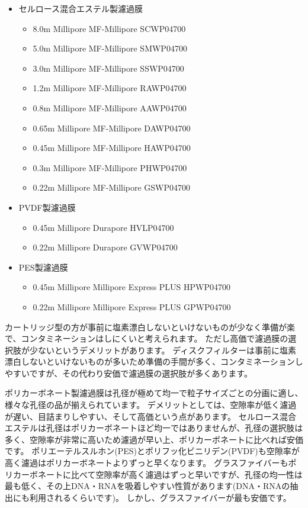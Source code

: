 \documentclass[titlepage,10pt,a4paper]{jsbook}
\begin{document}
\begin{itemize}
\begin{itemize}
\begin{itemize}
\item 0.4{\textmu}m Millipore Isopore HTTP04700
\item 0.22{\textmu}m Millipore Isopore GTTP04700
\end{itemize}
\item セルロース混合エステル製濾過膜
\begin{itemize}
\item 8.0{\textmu}m Millipore MF-Millipore SCWP04700
\item 5.0{\textmu}m Millipore MF-Millipore SMWP04700
\item 3.0{\textmu}m Millipore MF-Millipore SSWP04700
\item 1.2{\textmu}m Millipore MF-Millipore RAWP04700
\item 0.8{\textmu}m Millipore MF-Millipore AAWP04700
\item 0.65{\textmu}m Millipore MF-Millipore DAWP04700
\item 0.45{\textmu}m Millipore MF-Millipore HAWP04700
\item 0.3{\textmu}m Millipore MF-Millipore PHWP04700
\item 0.22{\textmu}m Millipore MF-Millipore GSWP04700
\end{itemize}
\item PVDF製濾過膜
\begin{itemize}
\item 0.45{\textmu}m Millipore Durapore HVLP04700
\item 0.22{\textmu}m Millipore Durapore GVWP04700
\end{itemize}
\item PES製濾過膜
\begin{itemize}
\item 0.45{\textmu}m Millipore Millipore Express PLUS HPWP04700
\item 0.22{\textmu}m Millipore Millipore Express PLUS GPWP04700
\end{itemize}
\end{itemize}
\end{itemize}

カートリッジ型の方が事前に塩素漂白しないといけないものが少なく準備が楽で、コンタミネーションはしにくいと考えられます。
ただし高価で濾過膜の選択肢が少ないというデメリットがあります。
ディスクフィルターは事前に塩素漂白しないといけないものが多いため準備の手間が多く、コンタミネーションしやすいですが、その代わり安価で濾過膜の選択肢が多くあります。

ポリカーボネート製濾過膜は孔径が極めて均一で粒子サイズごとの分画に適し、様々な孔径の品が揃えられています。
デメリットとしては、空隙率が低く濾過が遅い、目詰まりしやすい、そして高価という点があります。
セルロース混合エステルは孔径はポリカーボネートほど均一ではありませんが、孔径の選択肢は多く、空隙率が非常に高いため濾過が早い上、ポリカーボネートに比べれば安価です。
ポリエーテルスルホン(PES)とポリフッ化ビニリデン(PVDF)も空隙率が高く濾過はポリカーボネートよりずっと早くなります。
グラスファイバーもポリカーボネートに比べて空隙率が高く濾過はずっと早いですが、孔径の均一性は最も低く、その上DNA・RNAを吸着しやすい性質があります(DNA・RNAの抽出にも利用されるくらいです)。
しかし、グラスファイバーが最も安価です。
\end{document}
